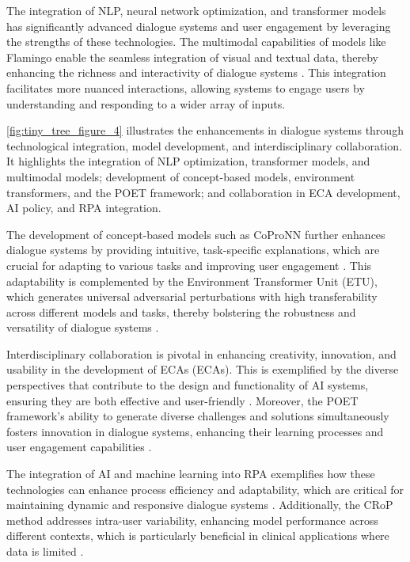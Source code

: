 The integration of NLP, neural network optimization, and transformer models has significantly advanced dialogue systems and user engagement by leveraging the strengths of these technologies. The multimodal capabilities of models like Flamingo enable the seamless integration of visual and textual data, thereby enhancing the richness and interactivity of dialogue systems \cite{alayrac2022flamingo}. This integration facilitates more nuanced interactions, allowing systems to engage users by understanding and responding to a wider array of inputs. 

\autoref{fig:tiny_tree_figure_4} illustrates the enhancements in dialogue systems through technological integration, model development, and interdisciplinary collaboration. It highlights the integration of NLP optimization, transformer models, and multimodal models; development of concept-based models, environment transformers, and the POET framework; and collaboration in ECA development, AI policy, and RPA integration.

The development of concept-based models such as CoProNN further enhances dialogue systems by providing intuitive, task-specific explanations, which are crucial for adapting to various tasks and improving user engagement \cite{chiaburu2024copronnconceptbasedprototypicalnearest}. This adaptability is complemented by the Environment Transformer Unit (ETU), which generates universal adversarial perturbations with high transferability across different models and tasks, thereby bolstering the robustness and versatility of dialogue systems \cite{zhang2024universaladversarialperturbationsvisionlanguage}.

Interdisciplinary collaboration is pivotal in enhancing creativity, innovation, and usability in the development of ECAs (ECAs). This is exemplified by the diverse perspectives that contribute to the design and functionality of AI systems, ensuring they are both effective and user-friendly \cite{korre2023takesvillagemultidisciplinaritycollaboration}. Moreover, the POET framework's ability to generate diverse challenges and solutions simultaneously fosters innovation in dialogue systems, enhancing their learning processes and user engagement capabilities \cite{wang2019pairedopenendedtrailblazerpoet}.

The integration of AI and machine learning into RPA exemplifies how these technologies can enhance process efficiency and adaptability, which are critical for maintaining dynamic and responsive dialogue systems \cite{pandy2024advancementsroboticsprocessautomation}. Additionally, the CRoP method addresses intra-user variability, enhancing model performance across different contexts, which is particularly beneficial in clinical applications where data is limited \cite{kaur2024cropcontextwiserobuststatic}.

